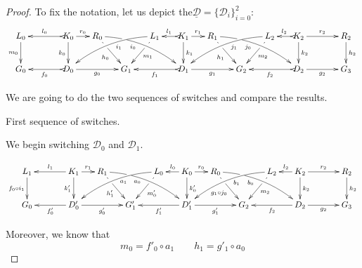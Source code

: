 \documentclass[a4paper,UKenglish,cleveref,pdftex,thm-restate,numberwithinsect,anonymous]{lipics}
\def\G{\textbf {\textup{G}}}
\newcommand{\dder}[1]{\mathscr{#1}}
\newcommand{\der}[1]{\underline{\dder{#1}}}
\begin{document}
\lemSwitchConfluence*
\label{lemSwitchConfluence-proof}

\begin{proof}
	To fix the notation, let us depict the$\der{D}=\{\dder{D}_i\}_{i=0}^2$:
	\[\xymatrix@C=15pt{L_0\ar[d]_{m_0}&& K_0 \ar[d]_{k_0}\ar@{>->}[ll]_{l_0} \ar[r]^{r_0} & R_0 \ar@/^.35cm/[drrr]_(.4){i_0}|(.285)\hole \ar[dr]|(.28)\hole_{h_0} && L_1 \ar@/_.35cm/[dlll]^(.4){i_1} \ar[dl]|(.28)\hole^{m_1}& K_1 \ar[d]^{k_1}\ar@{>->}[l]_{l_1} \ar[r]^{r_1} & R_1 \ar[dr]|(.28)\hole_{h_1} \ar@/^.35cm/[drrr]_(.4){j_0}|(.285)\hole  && L_2 \ar@/_.35cm/[dlll]^(.4){j_1} \ar[dl]|(.28)\hole^{m_2}& K_2 \ar[d]^{k_2}\ar@{>->}[l]_{l_2} \ar[rr]^{r_2} && R_2 \ar[d]^{h_2} \\G_0 && \ar@{>->}[ll]^{f_0} D_0 \ar[rr]_{g_0}&& G_1  && \ar@{>->}[ll]^{f_1} D_1 \ar[rr]_{g_1}&& G_2 && \ar@{>->}[ll]^{f_2} D_2 \ar[rr]_{g_2}&& G_3 }\]
	
	We are going to do the two sequences of switches and compare the results.
	
	\smallskip \noindent First sequence of switches.
	
	We begin switching $\dder{D}_0$ and $\dder{D}_1$.
	
	\[\xymatrix@C=15pt{L_1\ar[d]_{f_0\circ i_1}&& K_1 \ar[d]_{k'_1}\ar[ll]_{l_1} \ar[r]^{r_1} & R_1 \ar@/^.35cm/[drrr]_(.4){a_0}|(.285)\hole \ar[dr]|(.28)\hole_{h'_1} && L_0 \ar@/_.35cm/[dlll]^(.4){a_1} \ar[dl]|(.28)\hole^{m'_0}& K_0 \ar[d]^{k'_0}\ar[l]_{l_0} \ar[r]^{r_0} & R_0 \ar[dr]|(.28)\hole_{g_1\circ j_0} \ar@/^.35cm/[drrr]_(.4){b_0}|(.285)\hole  && L_2 \ar@/_.35cm/[dlll]^(.4){b_1} \ar[dl]|(.28)\hole^{m_2}& K_2 \ar[d]^{k_2}\ar[l]_{l_2} \ar[rr]^{r_2} && R_2 \ar[d]^{h_2} \\G_0 && \ar[ll]^{f'_0} D'_0 \ar[rr]_{g'_0}&& G'_1  && \ar[ll]^{f'_1} D'_1 \ar[rr]_{g'_1}&& G_2 && \ar[ll]^{f_2} D_2 \ar[rr]_{g_2}&& G_3 }\]
	
	Moreover, we know that
	\[m_0=f'_0\circ a_1 \qquad h_1=g'_1\circ a_0\]
	

\end{proof}
\end{document}
